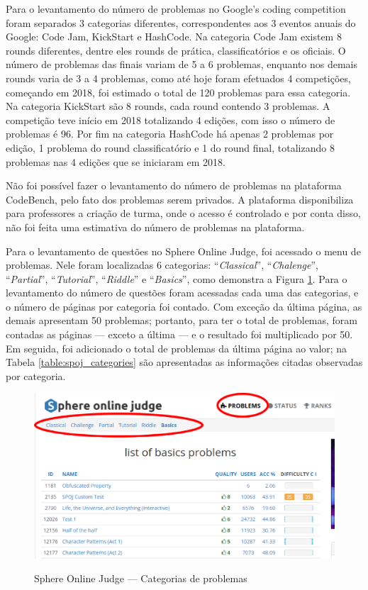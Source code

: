 Para o levantamento do número de problemas no Google's coding competition foram separados 3 categorias diferentes, correspondentes aos 3 eventos anuais do Google: Code Jam, KickStart e HashCode. Na categoria Code Jam existem 8 rounds diferentes, dentre eles rounds de prática, classificatórios e os oficiais. O número de problemas das finais variam de 5 a 6 problemas, enquanto nos demais rounds varia de 3 a 4 problemas, como até hoje foram efetuados 4 competições, começando em 2018, foi estimado o total de 120 problemas para essa categoria. Na categoria KickStart são 8 rounds, cada round contendo 3 problemas. A competição teve início em 2018 totalizando 4 edições, com isso o número de problemas é 96. Por fim na categoria HashCode há apenas 2 problemas por edição, 1 problema do round classificatório e 1 do round final, totalizando 8 problemas nas 4 edições que se iniciaram em 2018.

Não foi possível fazer o levantamento do número de problemas na plataforma CodeBench, pelo fato dos problemas serem privados. A plataforma disponibiliza para professores a criação de turma, onde o acesso é controlado e por conta disso, não foi feita uma estimativa do número de problemas na plataforma.

Para o levantamento de questões no Sphere Online Judge, foi acessado  o menu de problemas. Nele foram localizadas 6 categorias: ``\textit{Classical}'', ``\textit{Chalenge}'', ``\textit{Partial}'', ``\textit{Tutorial}'', ``\textit{Riddle}'' e ``\textit{Basics}'', como demonstra a Figura \ref{fig:spoj}. Para o levantamento do número de questões foram acessadas cada uma das categorias, e o número de páginas por categoria foi contado. Com exceção da última página, as demais apresentam 50 problemas; portanto, para ter o total de problemas, foram contadas as páginas — exceto a última — e o resultado foi multiplicado por 50. Em seguida, foi adicionado o total de problemas da última página ao valor; na Tabela \ref{table:spoj_categories} são apresentadas as informações citadas observadas por categoria.

\begin{figure}[H]
    \centering
    \caption{Sphere Online Judge — Categorias de problemas}
    \includegraphics[keepaspectratio=true,scale=0.4]{figuras/spoj.eps}
    \label{fig:spoj}
\end{figure}

